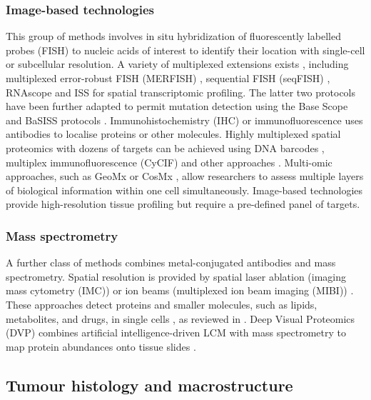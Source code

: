 {    \subsubsection*{Image-based technologies}
    This group of methods involves in situ hybridization of fluorescently labelled probes (FISH) to nucleic acids of interest to identify their location with single-cell or subcellular resolution. A variety of multiplexed extensions exists \parencite{Chen2015-ab,Lyubimova2013-jd,Chen2016-if,Coskun2016-jr,Codeluppi2018-nd,Wang2018-sl, Lee2015-ge,Qian2020-mp,Chen2018-dg,Alon2021-ce,Gyllborg2020-uq}, including multiplexed error-robust FISH (MERFISH) \parencite{Su2020-fb,Lu2022-yq}, sequential FISH (seqFISH) \parencite{Eng2019-rx}, RNAscope \parencite{Wang2012-pv} and \ac{ISS} \parencite{Ke2013-ux} for spatial transcriptomic profiling. The latter two protocols have been further adapted to permit mutation detection using the Base Scope \parencite{Baker2017-dv} and \ac{BaSISS} protocols \parencite{Lomakin2022-ks}. Immunohistochemistry (IHC) or immunofluorescence uses antibodies to localise proteins or other molecules. Highly multiplexed spatial proteomics with dozens of targets can be achieved using DNA barcodes \parencite{Goltsev2018-dd,Saka2019-lb}, multiplex immunofluorescence (CyCIF) \parencite{Lin2018-qf} and other approaches \parencite{Lin2015-ml,Gerdes2013-kn,Keren2019-cu}. Multi-omic approaches, such as GeoMx or CosMx \parencite{He2022-ee,Bergholtz2021-ql}, allow researchers to assess multiple layers of biological information within one cell simultaneously. Image-based technologies provide high-resolution tissue profiling but require a pre-defined panel of targets.
    \subsubsection*{Mass spectrometry}
    A further class of methods combines metal-conjugated antibodies and mass spectrometry. Spatial resolution is provided by spatial laser ablation (imaging mass cytometry (IMC)) \parencite{Giesen2014-yd} or ion beams (multiplexed ion beam imaging (MIBI)) \parencite{Angelo2014-gf}. These approaches detect proteins and smaller molecules, such as lipids, metabolites, and drugs, in single cells \parencite{Giesen2014-yd}, as reviewed in \textcite{Mund2022-kf}. Deep Visual Proteomics (DVP) combines artificial intelligence-driven LCM with mass spectrometry to map protein abundances onto tissue slides \parencite{Mund2022-fw}.}

\subsection*{Tumour histology and macrostructure}

